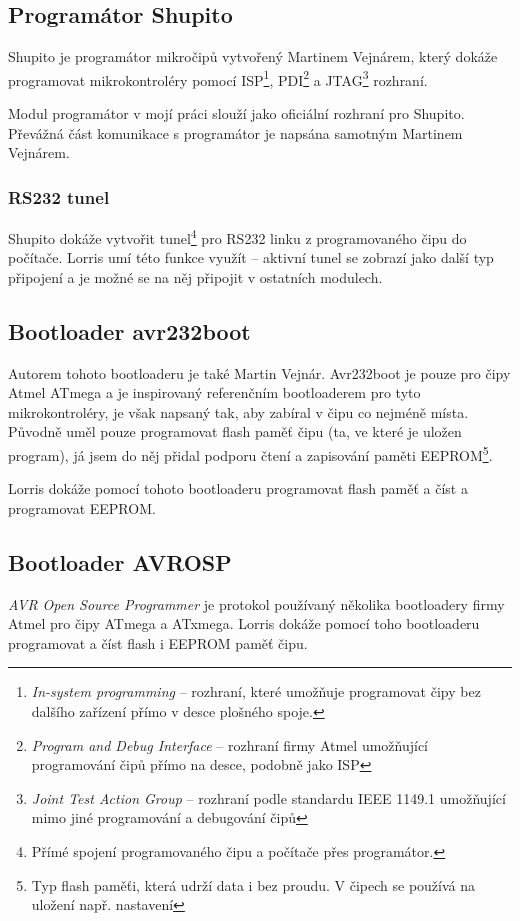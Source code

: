 \documentclass[12pt, a4paper, oneside]{article}
\newcommand{\It}{\textit}  %
\begin{document}
\subsection{Programátor Shupito}
Shupito je programátor mikročipů vytvořený Martinem Vejnárem, který dokáže programovat mikrokontroléry pomocí ISP\footnote{\It{In-system programming} -- rozhraní, které umožňuje programovat čipy bez dalšího zařízení přímo v desce plošného spoje.}, PDI\footnote{\It{Program and Debug Interface} -- rozhraní firmy Atmel umožňující programování čipů přímo na desce, podobně jako ISP} a JTAG\footnote{\It{Joint Test Action Group} -- rozhraní podle standardu IEEE 1149.1 umožňující mimo jiné programování a debugování čipů} rozhraní. 

Modul programátor v mojí práci slouží jako oficiální rozhraní pro Shupito. Převážná část komunikace s programátor je napsána samotným Martinem Vejnárem.

\subsubsection{RS232 tunel}
\label{tunel}
Shupito dokáže vytvořit tunel\footnote{Přímé spojení programovaného čipu a počítače přes programátor.} pro RS232 linku z programovaného čipu do počítače. Lorris umí této funkce využít -- aktivní tunel se zobrazí jako další typ připojení a je možné se na něj připojit v ostatních modulech.

\subsection{Bootloader avr232boot}
Autorem tohoto bootloaderu je také Martin Vejnár. Avr232boot je pouze pro čipy Atmel ATmega a je inspirovaný referenčním bootloaderem pro tyto mikrokontroléry, je však napsaný tak, aby zabíral v čipu co nejméně místa. Původně uměl pouze programovat flash paměť čipu (ta, ve které je uložen program), já jsem do něj přidal podporu čtení a zapisování paměti EEPROM\footnote{Typ flash paměťi, která udrží data i bez proudu. V čipech se používá na uložení např. nastavení}.

Lorris dokáže pomocí tohoto bootloaderu programovat flash paměť a číst a programovat EEPROM.

\subsection{Bootloader AVROSP}
\It{AVR Open Source Programmer} je protokol používaný několika bootloadery firmy Atmel pro čipy ATmega a ATxmega. Lorris dokáže pomocí toho bootloaderu programovat a číst flash i EEPROM paměť čipu.
\end{document}
